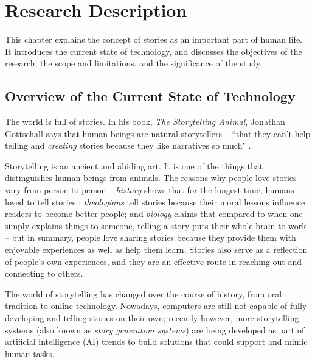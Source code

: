 %
%
%                 

\chapter{Research Description}
\label{sec:researchdesc} 

This chapter explains the concept of stories as an important part of human life. It introduces the current state of technology, and discusses the objectives of the research, the scope and limitations, and the significance of the study.

\section{Overview of the Current State of Technology}
\label{sec:overview}

The world is full of stories. In his book, \textit{The Storytelling Animal}, Jonathan Gottschall says that human beings are natural storytellers -- ``that they can't help telling and \textit{creating} stories because they like narratives so much" \cite{Gopnik2012}.

Storytelling is an ancient and abiding art. It is one of the things that distinguishes human beings from animals. The reasons why people love stories vary from person to person -- \textit{history} shows that for the longest time, humans loved to tell stories \cite{Gopnik2012}; \textit{theologians} tell stories because their moral lessons influence readers to become better people; and \textit{biology} claims that compared to when one simply explains things to someone, telling a story puts their whole brain to work \cite{Widrich2012} -- but in summary, people love sharing stories because they provide them with enjoyable experiences as well as help them learn. Stories also serve as a reflection of people's own experiences, and they are an effective route in reaching out and connecting to others.

The world of storytelling has changed over the course of history, from oral tradition to online technology. Nowadays, computers are still not capable of fully developing and telling stories on their own; recently however, more storytelling systems (also known as \textit{story generation systems}) are being developed as part of artificial intelligence (AI) trends to build solutions that could support and mimic human tasks.

